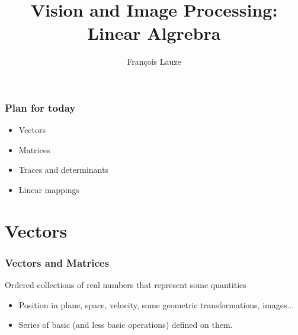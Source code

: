 \documentclass[8pt]{beamer}
\title{Vision and Image Processing:\\ Linear Algrebra}
\author[F.~Lauze] %
{Fran{\c c}ois Lauze}
\institute[DIKU] %
{
  Department of Computer Science\\
  University of Copenhagen
}
\date[2015-16 B2] %
\begin{document}
\maketitle









\begin{frame}
  \frametitle{Plan for today}
  \begin{itemize}
  \item Vectors
  \item Matrices
  \item Traces and determinants
  \item Linear mappings
  \end{itemize}
\end{frame}


\section{Vectors}

\begin{frame}
  \frametitle{Vectors and Matrices}
  Ordered collections of real numbers that represent some quantities
  \begin{itemize}
  \item Position in plane, space, velocity, some geometric transformations, images...
  \item Series of basic (and less basic operations)  defined on them.
  \end{itemize}
\end{frame}
\end{document}
